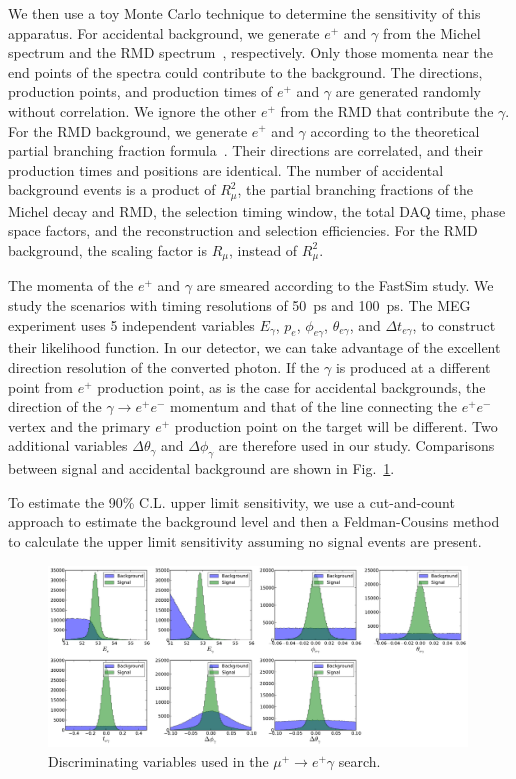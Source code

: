 We then use a toy Monte Carlo technique to determine the sensitivity of this
apparatus.
For accidental background, we generate $e^+$ and $\gamma$ from the Michel
spectrum and the RMD spectrum~\cite{Kuno:1999jp}, respectively. Only those momenta
near the end points of the spectra could contribute to the background.
The directions, production points, and production times of $e^+$ and 
$\gamma$ are generated
randomly without correlation. We ignore the other $e^+$ from the RMD that
contribute the $\gamma$.
For the RMD background, we generate $e^+$ and $\gamma$ according to the theoretical
partial branching fraction formula~\cite{Kuno:1999jp}. Their directions are
correlated, and their production times and positions are identical.
The number of accidental background events is a product of $R_\mu^2$, the partial
branching fractions of the Michel decay and RMD, the selection timing window, the
total DAQ time, phase space factors, and the reconstruction and selection 
efficiencies. For the RMD background, the scaling factor is $R_\mu$, instead of
$R_\mu^2$.

The momenta 
of the $e^+$ and $\gamma$ are smeared according to the FastSim study. 
We study the scenarios with timing resolutions of 50~ps and 100~ps. 
The MEG experiment uses 5 independent variables $E_\gamma$, $p_e$, 
$\phi_{e\gamma}$, $\theta_{e\gamma}$, and $\Delta t_{e\gamma}$, to construct
their likelihood function. In our detector, we can take advantage of the excellent
direction resolution of the converted photon. If the $\gamma$ is produced
at a different point from $e^+$ production point, as is the case for accidental backgrounds,
the direction of the $\gamma\to e^+e^-$ momentum and that of the line
connecting the $e^+e^-$ vertex and the primary $e^+$ production point on the target
will be different.  Two additional variables $\Delta\theta_\gamma$ 
and $\Delta\phi_\gamma$ are therefore used in our study. Comparisons between signal
and accidental background are shown in Fig.~\ref{fig:muegamma-vars}.

To estimate the 90\% C.L. upper limit sensitivity, we use a cut-and-count
approach to estimate the background level and then a Feldman-Cousins 
method~\cite{Feldman:1997qc} to calculate the upper limit sensitivity assuming
no signal events are present.



\begin{figure}[htbp]
\includegraphics[width=0.99\textwidth]{Figures/sens-vardists-50ps.pdf}
\caption{Discriminating variables used in the $\mu^+\to e^+\gamma$ search.}
\label{fig:muegamma-vars}
\end{figure}

